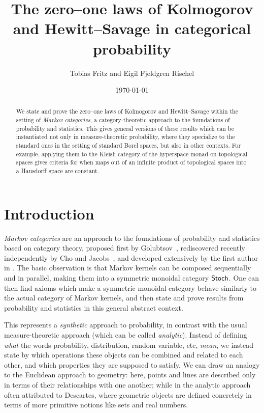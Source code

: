 \documentclass[11pt]{article}
\author{Tobias Fritz and Eigil Fjeldgren Rischel}
\title{The zero--one laws of Kolmogorov and Hewitt--Savage in categorical probability}
\date{\today}
\begin{document}
\maketitle

\begin{abstract}
	We state and prove the zero--one laws of Kolmogorov and Hewitt--Savage within the setting of \emph{Markov categories}, a category-theoretic approach to the foundations of probability and statistics. This gives general versions of these results which can be instantiated not only in measure-theoretic probability, where they specialize to the standard ones in the setting of standard Borel spaces, but also in other contexts. For example, applying them to the Kleisli category of the hyperspace monad on topological spaces gives criteria for when maps out of an infinite product of topological spaces into a Hausdorff space are constant.
\end{abstract}

\tableofcontents

\section{Introduction}

\emph{Markov categories} are an approach to the foundations of probability and statistics based on category theory, proposed first by Golubtsov~\cite{golubtsov}, rediscovered recently independently by Cho and Jacobs~\cite{cho_jacobs}, and developed extensively by the first author in \cite{markov_cats}. The basic observation is that Markov kernels can be composed sequentially and in parallel, making them into a symmetric monoidal category $\operatorname{\mathsf{Stoch}}$. One can then find axioms which make a symmetric monoidal category behave similarly to the actual category of Markov kernels, and then state and prove results from probability and statistics in this general abstract context.

This represents a \emph{synthetic} approach to probability, in contrast with the usual measure-theoretic approach (which can be called \emph{analytic}). Instead of defining \emph{what} the words probability, distribution, random variable, etc, \emph{mean}, we instead state by which operations these objects can be combined and related to each other, and which properties they are supposed to satisfy.
We can draw an analogy to the Euclidean approach to geometry: here, points and lines are described only in terms of their relationships with one another; while in the analytic approach often attributed to Descartes, where geometric objects are defined concretely in terms of more primitive notions like sets and real numbers.
\end{document}
